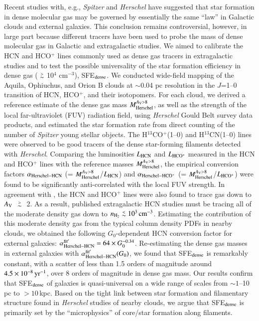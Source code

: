 \documentclass{aa}
\def\ltsima{$\; \buildrel < \over \sim \;$}
\def\simlt{\lower.5ex\hbox{\ltsima}}
\def\gtsima{$\; \buildrel > \over \sim \;$}
\def\simgt{\lower.5ex\hbox{\gtsima}}
\begin{document}
  \abstract
{Recent studies with, e.g., {\it Spitzer} and {\it Herschel} have suggested that star formation in dense molecular gas may be governed by essentially the same ``law'' in Galactic clouds and external galaxies. This conclusion remains controversial, however, in large part because different tracers have been used to probe the mass of dense molecular gas in Galactic and extragalactic studies.
}
 {
We aimed to calibrate the HCN and HCO$^+$ lines commonly used as dense gas tracers in extragalactic studies and to test the possible universality of the star formation efficiency in dense gas {($\simgt$10$^4$ cm$^{-3}$)}, SFE$_{\rm dense}$.
 }
{ 
We conducted wide-field mapping of the Aquila, Ophiuchus, and Orion B clouds at $\sim$0.04 pc  resolution in the $J$=1--0 transition of HCN, HCO$^+$, and their isotopomers. For each cloud, we derived a reference estimate of the dense gas mass $M_{\rm Herschel}^{A_{\rm V}>8}$,
as well as the strength of the local far-ultraviolet (FUV) radiation field, using {\it Herschel} Gould Belt survey data products, and estimated the star formation rate from direct counting of the number of  {\it Spitzer} young stellar objects.
}
{ 
The H$^{13}$CO$^+$(1--0) and H$^{13}$CN(1--0) lines were observed to be good tracers of the dense star-forming filaments detected with {\it Herschel}. Comparing the luminosities $L_{\rm HCN}$ and $L_{\rm HCO^+}$ measured in the HCN and HCO$^+$ lines with the reference masses $M_{\rm Herschel}^{A_{\rm V}>8}$, the empirical conversion factors $\alpha_{\rm Herschel-HCN}$ (= $M_{\rm Herschel}^{A_{\rm V}>8}$/$L_{\rm HCN}$) and  $\alpha_{\rm Herschel-HCO^+}$ (= $M_{\rm Herschel}^{A_{\rm V}>8}$/$L_{\rm HCO^+}$) were found to be significantly anti-correlated with the local FUV strength. In agreement with \citet{Pety16}, the HCN and HCO$^+$ lines were also found to trace gas down to $A_{\rm V}$ $\simgt$ 2. As a result, published extragalactic HCN studies must be tracing all of the moderate density gas down to $n_{\rm H_2}  \simlt 10^3\, \rm{cm}^{-3}$. Estimating the contribution of this moderate density gas from the typical column density PDFs in nearby clouds, we obtained the following $G_0$-dependent HCN conversion factor for external galaxies: $\alpha_{\rm Herschel-HCN}^{\rm fit^\prime} = 64\times G_{0}^{-0.34}$. Re-estimating the dense gas masses in external galaxies with $\alpha_{\rm Herschel-HCN}^{\rm fit^\prime}(G_0)$, we found that SFE$_{\rm dense}$ is remarkably constant, with a scatter of less than 1.5 orders of magnitude around $4.5\times10^{-8}\, {\rm yr}^{-1} $, over 8 orders of magnitude in dense gas mass.
}
{ 
Our results confirm that SFE$_{\rm dense}$ of galaxies is quasi-universal on a wide range of scales from $\sim 1$--10 pc to $> 10\,$kpc. Based on the tight link between star formation and filamentary structure found in {\it Herschel} studies of nearby clouds, we argue that SFE$_{\rm dense}$ is primarily set by the ``microphysics'' of core/star formation along  filaments.
}
\end{document}

